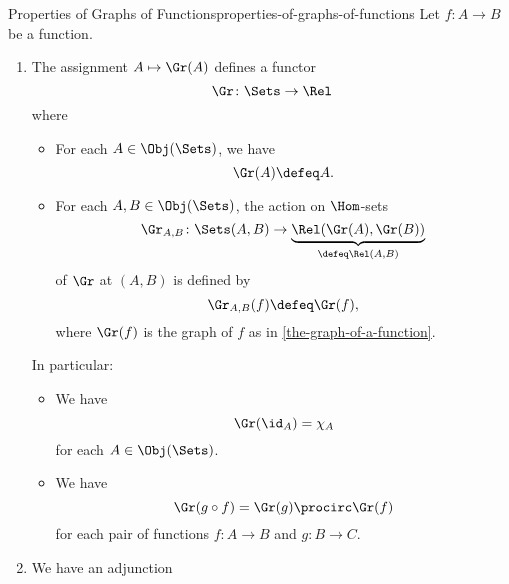 \begin{proposition}{Properties of Graphs of Functions}{properties-of-graphs-of-functions}%
    Let $f\colon A\to B$ be a function.
    \begin{enumerate}
        \item\label{properties-of-graphs-of-functions-functoriality}The assignment $A\mapsto\Gr(A)$ defines a functor
            \[
                \Gr%
                \colon%
                \Sets%
                \to%
                \Rel%
            \]%
            where
            \begin{itemize}
                \item{}For each $A\in\Obj(\Sets)$, we have
                    \[
                        \Gr(A)%
                        \defeq
                        A.
                    \]%
                \item{}For each $A,B\in\Obj(\Sets)$, the action on $\Hom$-sets
                    \[
                        \Gr_{A,B}%
                        \colon%
                        \Sets(A,B)
                        \to
                        \underbrace{\Rel(\Gr(A),\Gr(B))}_{\defeq\Rel(A,B)}%
                    \]%
                    of $\Gr$ at $(A,B)$ is defined by
                    \[
                        \Gr_{A,B}(f)
                        \defeq
                        \Gr(f),
                    \]%
                    where $\Gr(f)$ is the graph of $f$ as in \cref{the-graph-of-a-function}.
            \end{itemize}
            In particular:
            \begin{itemize}
                \item{}We have
                    \[
                        \Gr(\id_{A})%
                        =%
                        \chi_{A}%
                    \]%
                    for each $A\in\Obj(\Sets)$.
                \item{}We have
                    \[
                        \Gr(g\circ f)%
                        =%
                        \Gr(g)\procirc\Gr(f)%
                    \]%
                    for each pair of functions $f\colon A\to B$ and $g\colon B\to C$.
            \end{itemize}
        \item\label{properties-of-graphs-of-functions-adjointness-inside-sfbfrel}We have an adjunction

\end{enumerate}
\end{proposition}
